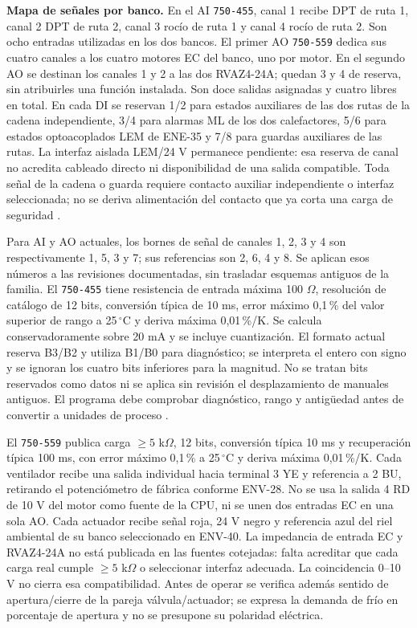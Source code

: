 \textbf{Mapa de señales por banco.} En el AI \texttt{750-455}, canal 1 recibe DPT de ruta 1, canal 2 DPT de ruta 2, canal 3 rocío de ruta 1 y canal 4 rocío de ruta 2. Son ocho entradas utilizadas en los dos bancos. El primer AO \texttt{750-559} dedica sus cuatro canales a los cuatro motores EC del banco, uno por motor. En el segundo AO se destinan los canales 1 y 2 a las dos RVAZ4-24A; quedan 3 y 4 de reserva, sin atribuirles una función instalada. Son doce salidas asignadas y cuatro libres en total. En cada DI se reservan 1/2 para estados auxiliares de las dos rutas de la cadena independiente, 3/4 para alarmas ML de los dos calefactores, 5/6 para estados optoacoplados LEM de ENE-35 y 7/8 para guardas auxiliares de las rutas. La interfaz aislada LEM/24 V permanece pendiente: esa reserva de canal no acredita cableado directo ni disponibilidad de una salida compatible. Toda señal de la cadena o guarda requiere contacto auxiliar independiente o interfaz seleccionada; no se deriva alimentación del contacto que ya corta una carga de seguridad \parencite[pp.~8, 11--12, 15]{lote34-ai}\parencite[pp.~7, 13]{lote34-ao}\parencite[pp.~8, 14]{lote34-di}.

Para AI y AO actuales, los bornes de señal de canales 1, 2, 3 y 4 son respectivamente 1, 5, 3 y 7; sus referencias son 2, 6, 4 y 8. Se aplican esos números a las revisiones documentadas, sin trasladar esquemas antiguos de la familia. El \texttt{750-455} tiene resistencia de entrada máxima 100 $\Omega$, resolución de catálogo de 12 bits, conversión típica de 10 ms, error máximo 0,1\,\% del valor superior de rango a 25\,$^{\circ}$C y deriva máxima 0,01\,\%/K. Se calcula conservadoramente sobre 20 mA y se incluye cuantización. El formato actual reserva B3/B2 y utiliza B1/B0 para diagnóstico; se interpreta el entero con signo y se ignoran los cuatro bits inferiores para la magnitud. No se tratan bits reservados como datos ni se aplica sin revisión el desplazamiento de manuales antiguos. El programa debe comprobar diagnóstico, rango y antigüedad antes de convertir a unidades de proceso \parencite[pp.~8, 11--12, 15]{lote34-ai}\parencite[pp.~7, 13]{lote34-ao}.

El \texttt{750-559} publica carga $\geq5$ k$\Omega$, 12 bits, conversión típica 10 ms y recuperación típica 100 ms, con error máximo 0,1\,\% a 25\,$^{\circ}$C y deriva máxima 0,01\,\%/K. Cada ventilador recibe una salida individual hacia terminal 3 YE y referencia a 2 BU, retirando el potenciómetro de fábrica conforme ENV-28. No se usa la salida 4 RD de 10 V del motor como fuente de la CPU, ni se unen dos entradas EC en una sola AO. Cada actuador recibe señal roja, 24 V negro y referencia azul del riel ambiental de su banco seleccionado en ENV-40. La impedancia de entrada EC y RVAZ4-24A no está publicada en las fuentes cotejadas: falta acreditar que cada carga real cumple $\geq5$ k$\Omega$ o seleccionar interfaz adecuada. La coincidencia 0--10 V no cierra esa compatibilidad. Antes de operar se verifica además sentido de apertura/cierre de la pareja válvula/actuador; se expresa la demanda de frío en porcentaje de apertura y no se presupone su polaridad eléctrica.

